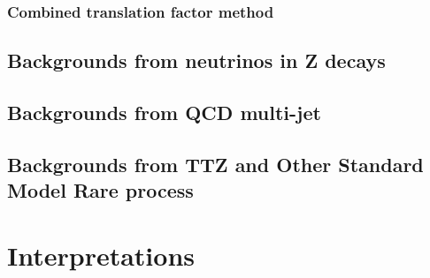 \subsubsection{Combined translation factor method}

\clearpage
\subsection{Backgrounds from neutrinos in Z decays}

\clearpage
\subsection{Backgrounds from QCD multi-jet}
\label{sec:c4bgqcd}


\subsection{Backgrounds from TTZ and Other Standard Model Rare process}

\section{Interpretations}
